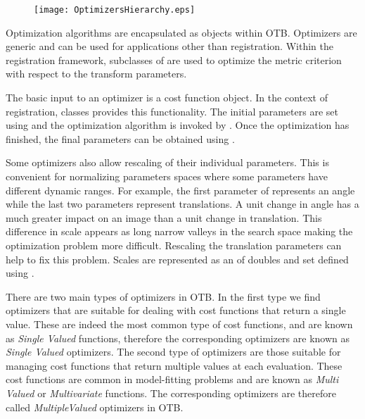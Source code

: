 


\begin{figure}
\center
\texttt{[image: OptimizersHierarchy.eps]}
\label{fig:OptimizersHierarchy}
\end{figure}

Optimization algorithms are encapsulated as  objects
within OTB. Optimizers are generic and can be used for applications other than
registration.  Within the registration framework, subclasses of
 are used to optimize the metric
criterion with respect to the transform parameters.


The basic input to an optimizer is a cost function object. In the context
of registration,  classes provides this functionality.
The initial parameters are set using  and
the optimization algorithm is invoked by .
Once the optimization has finished, the final parameters can be obtained
using .

Some optimizers also allow rescaling of their individual parameters. This is
convenient for normalizing parameters spaces where some parameters have
different dynamic ranges. For example, the first parameter of
 represents an angle while the last two parameters
represent translations. A unit change in angle has a much greater impact on an
image than a unit change in translation. This difference in scale appears as
long narrow valleys in the search space making the optimization problem more
difficult. Rescaling the translation parameters can help to fix this problem.
Scales are represented as an  of doubles and set defined using
.

There are two main types of optimizers in OTB. In the first type we find
optimizers that are suitable for dealing with cost functions that return a
single value. These are indeed the most common type of cost functions, and are
known as \emph{Single Valued} functions, therefore the corresponding optimizers
are known as \emph{Single Valued} optimizers. The second type of optimizers are
those suitable for managing cost functions that return multiple values at each
evaluation. These cost functions are common in model-fitting problems and are
known as \emph{Multi Valued} or \emph{Multivariate} functions.  The
corresponding optimizers are therefore called \emph{MultipleValued} optimizers
in OTB.

